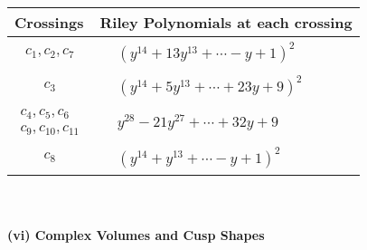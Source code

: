 \documentclass[1p]{elsarticle_modified}
\theoremstyle{definition}
\begin{document}
\begin{tabular}{m{50pt}|m{274pt}}
Crossings & \hspace{64pt}Riley Polynomials at each crossing \\
\hline $$\begin{aligned}c_{1},c_{2},c_{7}\end{aligned}$$&$\begin{aligned}
&(y^{14}+13 y^{13}+\cdots- y+1)^{2}
\end{aligned}$\\
\hline $$\begin{aligned}c_{3}\end{aligned}$$&$\begin{aligned}
&(y^{14}+5 y^{13}+\cdots+23 y+9)^{2}
\end{aligned}$\\
\hline $$\begin{aligned}c_{4},c_{5},c_{6}\\c_{9},c_{10},c_{11}\end{aligned}$$&$\begin{aligned}
&y^{28}-21 y^{27}+\cdots+32 y+9
\end{aligned}$\\
\hline $$\begin{aligned}c_{8}\end{aligned}$$&$\begin{aligned}
&(y^{14}+y^{13}+\cdots- y+1)^{2}
\end{aligned}$\\
\hline
\end{tabular}\\~\\
\newpage\flushleft \textbf{(vi) Complex Volumes and Cusp Shapes}
\end{document}
